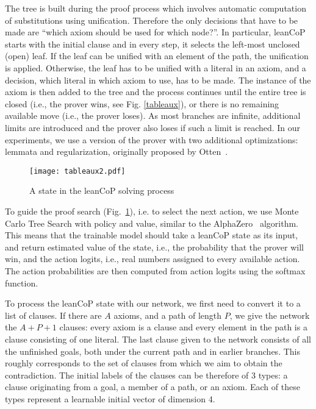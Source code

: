 \documentclass{ecai}
\def\systemname#1{\textsf{#1}\xspace}
\newcommand{\lc}{\systemname{leanCoP}}
\begin{document}
The tree is built during the proof process which involves
automatic computation of substitutions using unification. Therefore the only
decisions that have to be made are ``which axiom should be used for
which node?''. In particular, \lc starts with the initial
clause and in every step, it selects the left-most unclosed (open) leaf. If the
leaf can be unified with an element of the path, the unification is
applied. Otherwise, the leaf has to be unified with a literal in an
axiom, and a decision, which literal in which axiom to use, has to be
made. The instance of the axiom is then added to the tree and the
process continues until the entire tree is closed (i.e., the prover
wins, see Fig. \ref{tableaux}), or there is no remaining available move (i.e., the prover
loses). As most branches are infinite, additional limits are introduced
and the prover also loses if such a limit is reached.
In our experiments, we use a version of the prover with two additional
optimizations: lemmata and regularization, originally proposed by Otten~\cite{DBLP:journals/aicom/Otten10}.

\begin{figure}
  \centerline{\texttt{[image: tableaux2.pdf]}}
  \caption{A state in the \lc solving process}\label{tabstate}
\end{figure}


To guide the proof search (Fig.~\ref{tabstate}), i.e. to select the next action,
we use Monte Carlo Tree Search with policy and value, similar to the AlphaZero~\cite{silver2017mastering} algorithm. This
means that the trainable model should take a \lc state as its
input, and return estimated value of the state, i.e., the probability that the
prover will win, and the action logits, i.e., real numbers assigned to every
available action. The action probabilities are then computed from action
logits using the softmax function.

To process the \lc state with our network, we first need to
convert it to a list of clauses. If there are $A$ axioms, and a
path of length $P$, we give the network the $A+P+1$ clauses: every
axiom is a clause and every element in the path is a clause consisting of
one literal. The last clause given to the network consists of all
the unfinished goals, both under the current path and in earlier
branches. This roughly corresponds to the set of clauses from which we
aim to obtain the contradiction. The initial labels of the clauses can be
therefore of 3 types: a clause originating from a goal, a member of a path, or an
axiom. Each of these types represent a learnable initial vector of
dimension 4.
\end{document}
